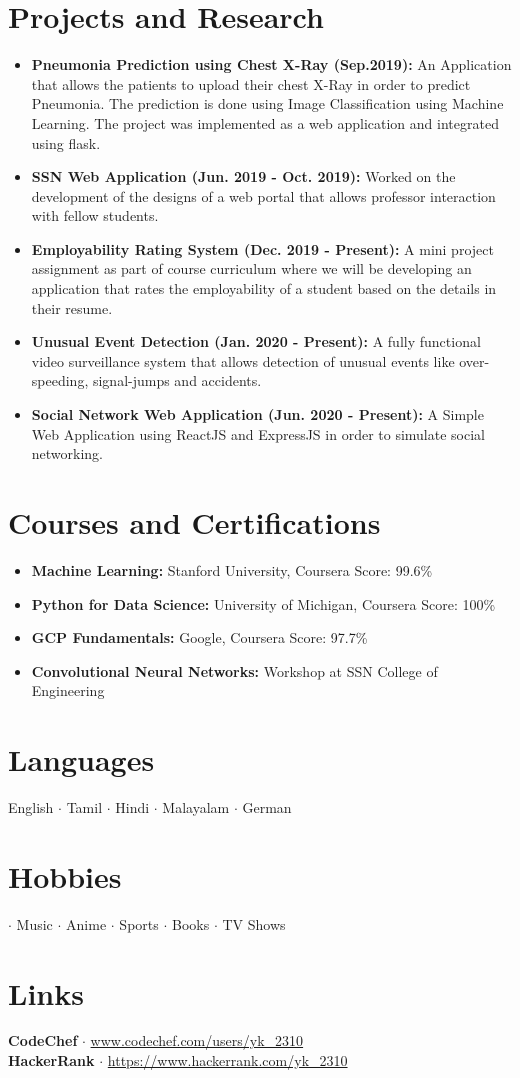\documentclass[letterpaper,12pt]{article}
\newcommand{\resumeItem}[2]{
\item\small{
\textbf{#1}{ #2 \vspace{-2pt}}
}
}
\newcommand{\resumeSubHeadingListStart}{\begin{itemize}[leftmargin=*]}
\newcommand{\resumeSubHeadingListEnd}{\end{itemize}}
\begin{document}
\section{Projects and Research}
\resumeSubHeadingListStart
\resumeItem{Pneumonia Prediction using Chest X-Ray (Sep.2019):}{An Application that allows the patients to upload their chest X-Ray in order to predict Pneumonia. The prediction is done using Image Classification using Machine Learning. The project was implemented as a web application and integrated using flask. }
\resumeItem{SSN Web Application (Jun. 2019 - Oct. 2019):}{Worked on the development of the designs of a web portal that allows professor interaction with fellow students.}
\resumeItem{Employability Rating System (Dec. 2019 - Present):}{A mini project assignment as part of course curriculum where we will be developing an application that rates the employability of a student based on the details in their resume.}
\resumeItem{Unusual Event Detection (Jan. 2020 - Present):}{ A fully functional video surveillance system that allows detection of unusual events like over-speeding, signal-jumps and accidents.
}
\resumeItem{Social Network Web Application (Jun. 2020 - Present):}{ A Simple Web Application using ReactJS and ExpressJS in order to simulate social networking.
}
\resumeSubHeadingListEnd


\section{Courses and Certifications}
\resumeSubHeadingListStart
\resumeItem{Machine Learning:}{Stanford University, Coursera}{Score: 99.6\%}
\resumeItem{Python for Data Science:}{University of Michigan, Coursera}{Score: 100\%}
\resumeItem{GCP Fundamentals:}{Google, Coursera}{Score: 97.7\%}
\resumeItem{Convolutional Neural Networks:}{Workshop at SSN College of Engineering}
\resumeSubHeadingListEnd

\section{Languages}
English $\cdot$ Tamil $\cdot$ Hindi $\cdot$ Malayalam  $\cdot$ German

\section{Hobbies}
 $\cdot$ Music $\cdot$ Anime $\cdot$ Sports $\cdot$ Books $\cdot$ TV Shows
 
 \section{Links}
 \textbf{CodeChef}
 $\cdot$ \href{www.codechef.com/users/yk_2310}{www.codechef.com/users/yk\_2310}\\ 
  \textbf{HackerRank}
 $\cdot$ \href{www.hackerrank.com/yk_2310}{https://www.hackerrank.com/yk\_2310}
\end{document}
